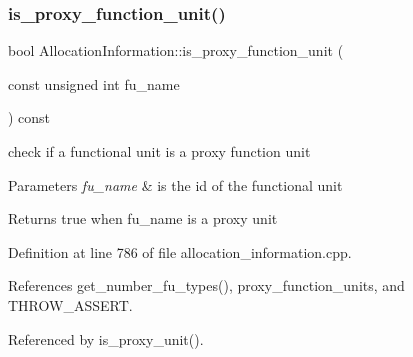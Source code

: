 \subsubsection{\texorpdfstring{is\+\_\+proxy\+\_\+function\+\_\+unit()}{is\_proxy\_function\_unit()}}
{\footnotesize\ttfamily bool Allocation\+Information\+::is\+\_\+proxy\+\_\+function\+\_\+unit (\begin{DoxyParamCaption}\item[{const unsigned int}]{fu\+\_\+name }\end{DoxyParamCaption}) const}



check if a functional unit is a proxy function unit 


\begin{DoxyParams}{Parameters}
{\em fu\+\_\+name} & is the id of the functional unit \\
\hline
\end{DoxyParams}
\begin{DoxyReturn}{Returns}
true when fu\+\_\+name is a proxy unit 
\end{DoxyReturn}


Definition at line 786 of file allocation\+\_\+information.\+cpp.



References get\+\_\+number\+\_\+fu\+\_\+types(), proxy\+\_\+function\+\_\+units, and T\+H\+R\+O\+W\+\_\+\+A\+S\+S\+E\+RT.



Referenced by is\+\_\+proxy\+\_\+unit().

